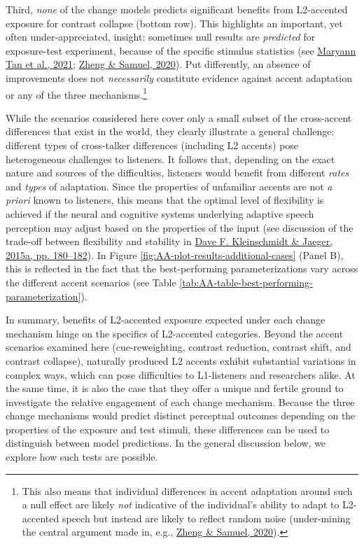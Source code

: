 \documentclass[
  11pt,
  english,
  man,floatsintext]{apa6}
\begin{document}
Third, \emph{none} of the change models predicts significant benefits from L2-accented exposure for contrast collapse (bottom row). This highlights an important, yet often under-appreciated, insight: sometimes null results are \emph{predicted} for exposure-test experiment, because of the specific stimulus statistics (see \protect\hyperlink{ref-tan2021}{Maryann Tan et al., 2021}; \protect\hyperlink{ref-zheng-samuel2020}{Zheng \& Samuel, 2020}). Put differently, an absence of improvements does not \emph{necessarily} constitute evidence against accent adaptation or any of the three mechanisms.\footnote{This also means that individual differences in accent adaptation around such a null effect are likely \emph{not} indicative of the individual's ability to adapt to L2-accented speech but instead are likely to reflect random noise (under-mining the central argument made in, e.g., \protect\hyperlink{ref-zheng-samuel2020}{Zheng \& Samuel, 2020}).}

While the scenarios considered here cover only a small subset of the cross-accent differences that exist in the world, they clearly illustrate a general challenge: different types of cross-talker differences (including L2 accents) pose heterogeneous challenges to listeners. It follows that, depending on the exact nature and sources of the difficulties, listeners would benefit from different \emph{rates} and \emph{types} of adaptation. Since the properties of unfamiliar accents are not \emph{a priori} known to listeners, this means that the optimal level of flexibility is achieved if the neural and cognitive systems underlying adaptive speech perception may adjust based on the properties of the input (see discussion of the trade-off between flexibility and stability in \protect\hyperlink{ref-kleinschmidt-jaeger2015}{Dave F. Kleinschmidt \& Jaeger, 2015a, pp. 180--182}). In Figure \ref{fig:AA-plot-results-additional-cases} (Panel B), this is reflected in the fact that the best-performing parameterizations vary across the different accent scenarios (see Table \ref{tab:AA-table-best-performing-parameterization}).

In summary, benefits of L2-accented exposure expected under each change mechanism hinge on the specifics of L2-accented categories. Beyond the accent scenarios examined here (cue-reweighting, contrast reduction, contrast shift, and contrast collapse), naturally produced L2 accents exhibit substantial variations in complex ways, which can pose difficulties to L1-listeners and researchers alike. At the same time, it is also the case that they offer a unique and fertile ground to investigate the relative engagement of each change mechanism. Because the three change mechanisms would predict distinct perceptual outcomes depending on the properties of the exposure and test stimuli, these differences can be used to distinguish between model predictions. In the general discussion below, we explore how such tests are possible.
\end{document}
